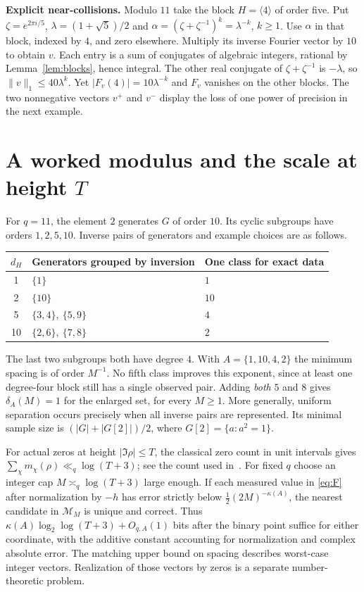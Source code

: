 \documentclass[11pt]{article}
\newcommand{\calM}{\mathcal M}
\begin{document}
\smallskip
\noindent\textbf{Explicit near-collisions.} Modulo $11$ take the block $H=\langle4\rangle$ of order five. Put $\zeta=e^{2\pi i/5}$, $\lambda=(1+\sqrt5)/2$ and $\alpha=(\zeta+\zeta^{-1})^k=\lambda^{-k}$, $k\ge1$. Use $\alpha$ in that block, indexed by $4$, and zero elsewhere. Multiply its inverse Fourier vector by $10$ to obtain $v$. Each entry is a sum of conjugates of algebraic integers, rational by Lemma~\ref{lem:blocks}, hence integral. The other real conjugate of $\zeta+\zeta^{-1}$ is $-\lambda$, so $\|v\|_1\le40\lambda^k$. Yet $|F_v(4)|=10\lambda^{-k}$ and $F_v$ vanishes on the other blocks. The two nonnegative vectors $v^+$ and $v^-$ display the loss of one power of precision in the next example.

\newpage
\section{A worked modulus and the scale at height \texorpdfstring{$T$}{T}}
For $q=11$, the element $2$ generates $G$ of order $10$. Its cyclic subgroups have orders $1,2,5,10$. Inverse pairs of generators and example choices are as follows.
\begin{center}
\begin{tabular}{cll}
\toprule
$d_H$ & Generators grouped by inversion & One class for exact data\\
\midrule
1  & $\{1\}$ & $1$\\
2  & $\{10\}$ & $10$\\
5  & $\{3,4\},\ \{5,9\}$ & $4$\\
10 & $\{2,6\},\ \{7,8\}$ & $2$\\
\bottomrule
\end{tabular}
\end{center}
The last two subgroups both have degree $4$. With $A=\{1,10,4,2\}$ the minimum spacing is of order $M^{-1}$. No fifth class improves this exponent, since at least one degree-four block still has a single observed pair. Adding \emph{both} $5$ and $8$ gives $\delta_A(M)=1$ for the enlarged set, for every $M\ge1$. More generally, uniform separation occurs precisely when all inverse pairs are represented. Its minimal sample size is $(|G|+|G[2]|)/2$, where $G[2]=\{a:a^2=1\}$.

For actual zeros at height $|\Im\rho|\le T$, the classical zero count in unit intervals gives $\sum_\chi m_\chi(\rho)\ll_q\log(T+3)$; see the count used in~\cite[\S2.3, \S2.7]{KR}. For fixed $q$ choose an integer cap $M\asymp_q\log(T+3)$ large enough. If each measured value in \eqref{eq:F} after normalization by $-h$ has error strictly below $\tfrac12(2M)^{-\kappa(A)}$, the nearest candidate in $\calM_M$ is unique and correct. Thus $\kappa(A)\log_2\log(T+3)+O_{q,A}(1)$ bits after the binary point suffice for either coordinate, with the additive constant accounting for normalization and complex absolute error. The matching upper bound on spacing describes worst-case integer vectors. Realization of those vectors by zeros is a separate number-theoretic problem.
\end{document}
